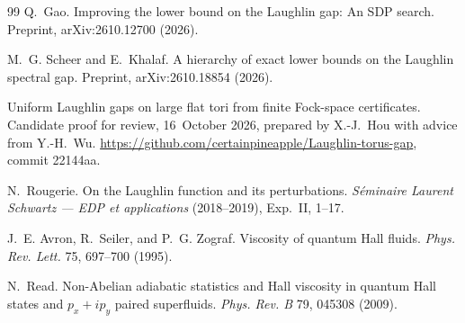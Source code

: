 \documentclass[11pt]{article}
\begin{document}
\begin{thebibliography}{99}
Q.~Gao.
\newblock Improving the lower bound on the {L}aughlin gap: {A}n {SDP} search.
\newblock Preprint, arXiv:2610.12700 (2026).

M.~G. Scheer and E.~Khalaf.
\newblock A hierarchy of exact lower bounds on the {L}aughlin spectral gap.
\newblock Preprint, arXiv:2610.18854 (2026).

Uniform {L}aughlin gaps on large flat tori from finite {F}ock-space certificates.
\newblock Candidate proof for review, 16~October 2026, prepared by X.-J.~Hou with advice from Y.-H.~Wu.
\newblock \url{https://github.com/certainpineapple/Laughlin-torus-gap}, commit 22144aa.

N.~Rougerie.
\newblock On the {L}aughlin function and its perturbations.
\newblock \emph{S\'eminaire Laurent Schwartz --- EDP et applications} (2018--2019), Exp.~II, 1--17.

J.~E. Avron, R.~Seiler, and P.~G. Zograf.
\newblock Viscosity of quantum {H}all fluids.
\newblock \emph{Phys. Rev. Lett.} 75, 697--700 (1995).

N.~Read.
\newblock Non-{A}belian adiabatic statistics and {H}all viscosity in quantum {H}all states and $p_x+ip_y$ paired
superfluids.
\newblock \emph{Phys. Rev. B} 79, 045308 (2009).

\end{thebibliography}
\end{document}

